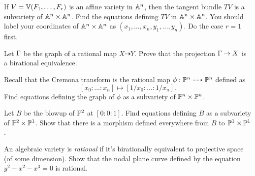 \documentclass[12pt]{memoir}
\begin{document}
\begin{Ej}
    If $V = \mathbb{V}(F_1,\dots, F_r)$ is an affine variety in $\mathbb{A}^n$, then the
    tangent bundle $TV$ is a subvariety of $\mathbb{A}^n\times\mathbb{A}^n$. Find the equations defining $TV$ in
    $\mathbb{A}^n\times\mathbb{A}^n$. You should label your coordinates of $\mathbb{A}^n\times\mathbb{A}^n$ as $(x_1,\dots,x_n,y_1,\dots,y_n)$. Do the case $r = 1$ first.
\end{Ej}

\begin{ptcbr}
\end{ptcbr}

\begin{Ej}
    Let $\Gamma$ be the graph of a rational map $X\dashrightarrow Y$. Prove that the projection $\Gamma\to X$ is a birational equivalence.
\end{Ej}

\begin{ptcbr}
\end{ptcbr}

\begin{Ej}
    Recall that the Cremona transform is the rational map $\phi:\mathbb{P}^n\dashrightarrow\mathbb{P}^n$ defined as
    $$[x_0:\dots:x_n]\mapsto[1/x_0:\dots:1/x_n].$$
    Find equations defining the graph of $\phi$ as a subvariety of $\mathbb{P}^n\times\mathbb{P}^n$.
\end{Ej}

\begin{ptcbr}
\end{ptcbr}

\begin{Ej}
    Let $B$ be the blowup of $\mathbb{P}^2$ at $[0:0:1]$. Find equations defining $B$ as a subvariety of $\mathbb{P}^2\times\mathbb{P}^1$. Show that there is a morphism defined everywhere from $B$ to $\mathbb{P}^1\times\mathbb{P}^1$.
\end{Ej}

\begin{ptcbr}
\end{ptcbr}
 
\begin{Ej}
    An algebraic variety is \emph{rational} if it's birationally equivalent to projective space (of some dimension). Show that the nodal plane curve defined by the equation $y^2-x^2-x^3=0$ is rational. 
\end{Ej}

\begin{ptcbr}
\end{ptcbr}
\end{document}
